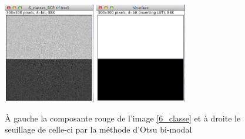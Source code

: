 \documentclass[a4paper,10pt]{article}
\begin{document}
\begin{figure}
\begin{center}
	\includegraphics[width=4cm]{images/6_classe_rouge}
	\includegraphics[width=4cm]{images/6_classe_binaire}
\end{center}
	\caption{\`A gauche la composante rouge de l'image \ref{6_classe} et \`a droite le seuillage de celle-ci par la m\'ethode d'Otsu bi-modal}
	\label{6_classe_gris_rouge}
\end{figure}
\end{document}
